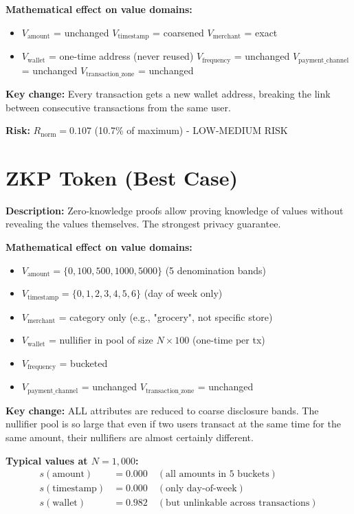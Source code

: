 \documentclass[12pt,a4paper,oneside,openany]{report}
\begin{document}
\textbf{Mathematical effect on value domains:}
\begin{itemize}
    \item $V_{\text{amount}}$ = unchanged
    $V_{\text{timestamp}}$ = coarsened
    $V_{\text{merchant}}$ = exact
    \item $V_{\text{wallet}}$ = one-time address (never reused)
    $V_{\text{frequency}}$ = unchanged
    $V_{\text{payment\_channel}}$ = unchanged
    $V_{\text{transaction\_zone}}$ = unchanged
\end{itemize}

\textbf{Key change:} Every transaction gets a new wallet address, breaking the link between consecutive transactions from the same user.

\textbf{Risk:} $R_{\mathrm{norm}} = 0.107$ (10.7\% of maximum) - LOW-MEDIUM RISK

\section{ZKP Token (Best Case)}
\label{sec:zkp}

\textbf{Description:} Zero-knowledge proofs allow proving knowledge of values without revealing the values themselves. The strongest privacy guarantee.

\textbf{Mathematical effect on value domains:}
\begin{itemize}
    \item $V_{\text{amount}} = \{0, 100, 500, 1000, 5000\}$ (5 denomination bands)
    \item $V_{\text{timestamp}} = \{0, 1, 2, 3, 4, 5, 6\}$ (day of week only)
    \item $V_{\text{merchant}}$ = category only (e.g., "grocery", not specific store)
    \item $V_{\text{wallet}}$ = nullifier in pool of size $N \times 100$ (one-time per tx)
    \item $V_{\text{frequency}}$ = bucketed
    \item $V_{\text{payment\_channel}}$ = unchanged
    $V_{\text{transaction\_zone}}$ = unchanged
\end{itemize}

\textbf{Key change:} ALL attributes are reduced to coarse disclosure bands. The nullifier pool is so large that even if two users transact at the same time for the same amount, their nullifiers are almost certainly different.

\textbf{Typical values at $N = 1,000$:}
\begin{align*}
s(\text{amount}) &= 0.000 \quad (\text{all amounts in 5 buckets})\\
s(\text{timestamp}) &= 0.000 \quad (\text{only day-of-week})\\
s(\text{wallet}) &= 0.982 \quad (\text{but unlinkable across transactions})
\end{align*}
\end{document}
